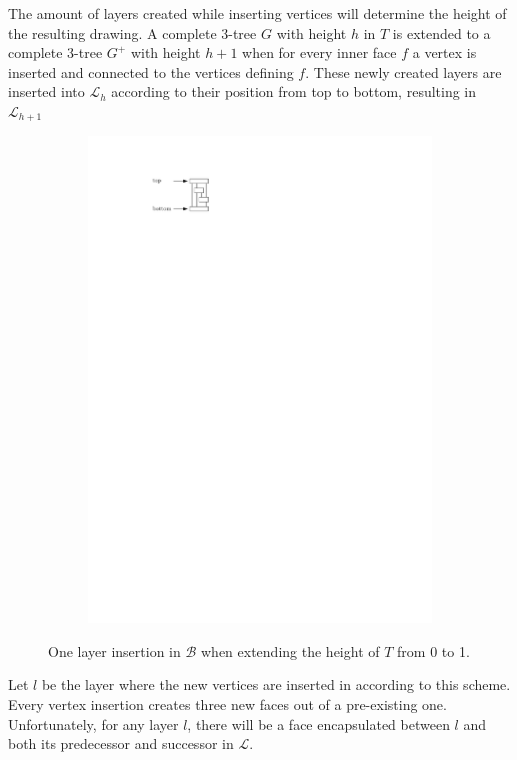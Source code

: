 The amount of layers created while inserting vertices will determine the height of the resulting drawing.  A complete 3-tree $G$ with height $h$ in $T$ is extended to a complete 3-tree $G^+$ with height $h+1$ when for every inner face $f$ a vertex is inserted and connected to the vertices defining $f$. These newly created layers are inserted into $\mathcal{L}_h$ according to their position from top to bottom, resulting in $\mathcal{L}_{h+1}$

\begin{figure}[H]
	\centering
	\begin{subfigure}{\textwidth}
		\centering
		\includegraphics[page=2,width=0.6\linewidth]{graphics/3-tree_example.pdf}
	\end{subfigure}
	\caption*{One layer insertion in $\mathcal{B}$ when extending the height of $T$ from 0 to 1.}
\end{figure}
Let $l$ be the layer where the new vertices are inserted in according to this scheme. Every vertex insertion creates three new faces out of a pre-existing one. Unfortunately, for any layer $l$, there will be a face encapsulated between $l$ and both its predecessor and successor in $\mathcal{L}$.
